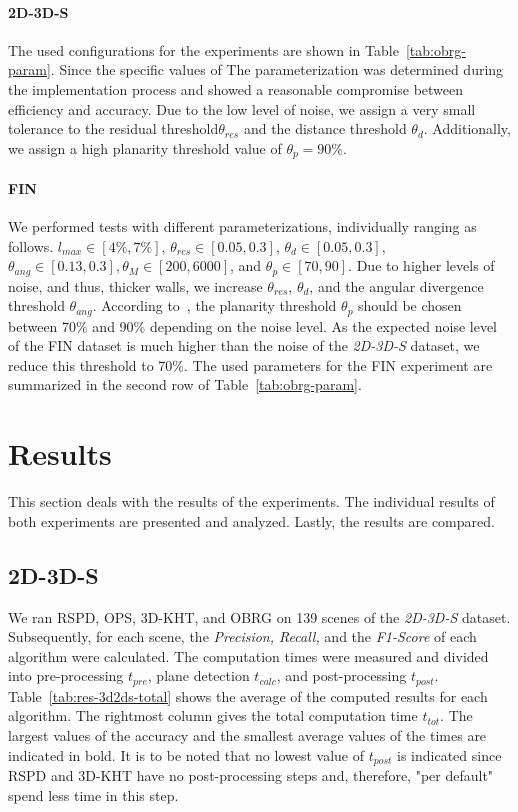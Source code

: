 \documentclass[main.tex]{subfiles}
\begin{document}
\paragraph{2D-3D-S}
The used configurations for the experiments are shown in Table~\ref{tab:obrg-param}.
Since the specific values of 
The parameterization was determined during the implementation process and showed a reasonable compromise between
efficiency and accuracy.
Due to the low level of noise, we assign a very small tolerance to the residual threshold$\theta_{res}$ and the distance threshold $\theta_d$.
Additionally, we assign a high planarity threshold value of $\theta_p = 90\%$.

\paragraph{FIN}
We performed tests with different parameterizations, individually ranging as follows.
$l_{max} \in [4\%, 7\%]$, $\theta_{res} \in [0.05, 0.3]$, $\theta_d \in [0.05, 0.3]$, $\theta_{ang}\in[0.13, 0.3], \theta_M \in [200, 6000]$,
and $\theta_p\in[70, 90]$.
Due to higher levels of noise, and thus, thicker walls, we increase $\theta_{res}$, $\theta_d$, and the angular divergence threshold $\theta_{ang}$.
According to~\cite[Section~3.4]{Vo_Truong-Hong_Laefer_Bertolotto_2015},
the planarity threshold $\theta_p$ should be chosen between 70\% and 90\% depending on the noise level. As the expected noise level of the
FIN dataset is much higher than the noise of the \textit{2D-3D-S} dataset, we reduce this threshold to 70\%.
The used parameters for the FIN experiment are summarized in the second row of Table~\ref{tab:obrg-param}.


\section{Results}
This section deals with the results of the experiments.
The individual results of both experiments are presented and analyzed. Lastly, the results are compared.


\subsection{2D-3D-S}

We ran RSPD, OPS, 3D-KHT, and OBRG on 139 scenes of the \textit{2D-3D-S} dataset. Subsequently, for each scene, the \textit{Precision, Recall,} and
the \textit{F1-Score} of each algorithm were calculated. The computation times were measured and divided into pre-processing $t_{pre}$, plane detection $t_{calc}$,
and post-processing $t_{post}$. Table~\ref{tab:res-3d2ds-total} shows the average of the computed results for each algorithm.
The rightmost column gives the total computation time $t_{tot}$. The largest values of the accuracy and the smallest average
values of the times are indicated in bold. It is to be noted that no lowest value of $t_{post}$ is indicated since RSPD and 3D-KHT
have no post-processing steps and, therefore, "per default" spend less time in this step.
\end{document}
